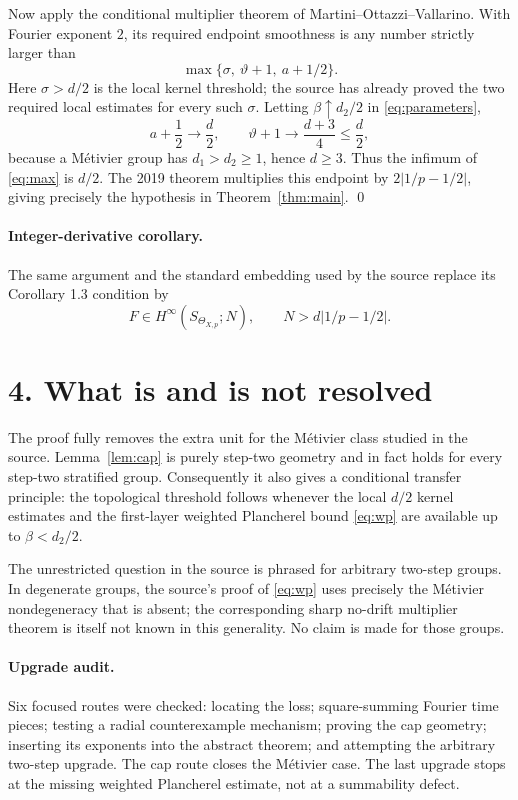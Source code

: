 \documentclass[10pt,a4paper]{article}
\begin{document}
Now apply the conditional multiplier theorem of Martini--Ottazzi--Vallarino.
With Fourier exponent $2$, its required endpoint smoothness is any number
strictly larger than
\begin{equation}\label{eq:max}
 \max\{\sigma,\ \vartheta+1,\ a+1/2\}.
\end{equation}
Here $\sigma>d/2$ is the local kernel threshold; the source has already proved
the two required local estimates for every such $\sigma$.  Letting
$\beta\uparrow d_2/2$ in \eqref{eq:parameters},
\[
 a+\frac12\longrightarrow\frac d2,
 \qquad
 \vartheta+1\longrightarrow\frac{d+3}{4}\le\frac d2,
\]
because a Métivier group has $d_1>d_2\ge1$, hence $d\ge3$.  Thus the infimum
of \eqref{eq:max} is $d/2$.  The 2019 theorem multiplies this endpoint by
$2|1/p-1/2|$, giving precisely the hypothesis in Theorem~\ref{thm:main}.
\qed

\paragraph{Integer-derivative corollary.}
The same argument and the standard embedding used by the source replace its
Corollary 1.3 condition by
\[
 F\in H^\infty(S_{\Theta_{X,p}};N),
 \qquad N>d|1/p-1/2|.
\]

\section*{4. What is and is not resolved}

The proof fully removes the extra unit for the Métivier class studied in the
source.  Lemma~\ref{lem:cap} is purely step-two geometry and in fact holds for
every step-two stratified group.  Consequently it also gives a conditional
transfer principle: the topological threshold follows whenever the local
$d/2$ kernel estimates and the first-layer weighted Plancherel bound
\eqref{eq:wp} are available up to $\beta<d_2/2$.

The unrestricted question in the source is phrased for arbitrary two-step
groups.  In degenerate groups, the source's proof of \eqref{eq:wp} uses
precisely the Métivier nondegeneracy that is absent; the corresponding sharp
no-drift multiplier theorem is itself not known in this generality.  No claim
is made for those groups.

\paragraph{Upgrade audit.}
Six focused routes were checked: locating the loss; square-summing Fourier
time pieces; testing a radial counterexample mechanism; proving the cap
geometry; inserting its exponents into the abstract theorem; and attempting
the arbitrary two-step upgrade.  The cap route closes the Métivier case.  The
last upgrade stops at the missing weighted Plancherel estimate, not at a
summability defect.
\end{document}
